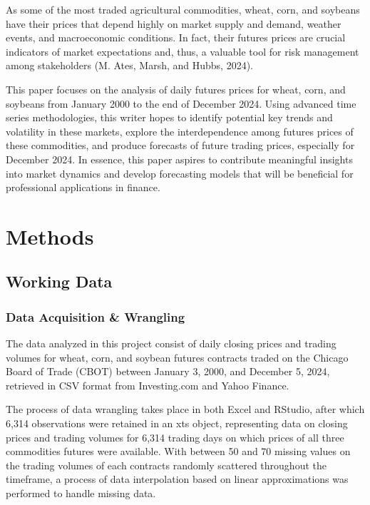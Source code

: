 \documentclass[11pt]{article}
\begin{document}
As some of the most traded agricultural commodities, wheat, corn, and soybeans have their prices that depend highly on market supply and demand, weather events, and macroeconomic conditions. In fact, their futures prices are crucial indicators of market expectations and, thus, a valuable tool for risk management among stakeholders (M. Ates, Marsh, and Hubbs, 2024).

This paper focuses on the analysis of daily futures prices for wheat, corn, and soybeans from January 2000 to the end of December 2024. Using advanced time series methodologies, this writer hopes to identify potential key trends and volatility in these markets, explore the interdependence among futures prices of these commodities, and produce forecasts of future trading prices, especially for December 2024. In essence, this paper aspires to contribute meaningful insights into market dynamics and develop forecasting models that will be beneficial for professional applications in finance.

\section{Methods}

\subsection{Working Data}

\subsubsection{Data Acquisition \& Wrangling}

The data analyzed in this project consist of daily closing prices and trading volumes for wheat, corn, and soybean futures contracts traded on the Chicago Board of Trade (CBOT) between January 3, 2000, and December 5, 2024, retrieved in CSV format from Investing.com and Yahoo Finance.

The process of data wrangling takes place in both Excel and RStudio, after which 6,314 observations were retained in an xts object, representing data on closing prices and trading volumes for 6,314 trading days on which prices of all three commodities futures were available. With between 50 and 70 missing values on the trading volumes of each contracts randomly scattered throughout the timeframe, a process of data interpolation based on linear approximations was performed to handle missing data.
\end{document}
